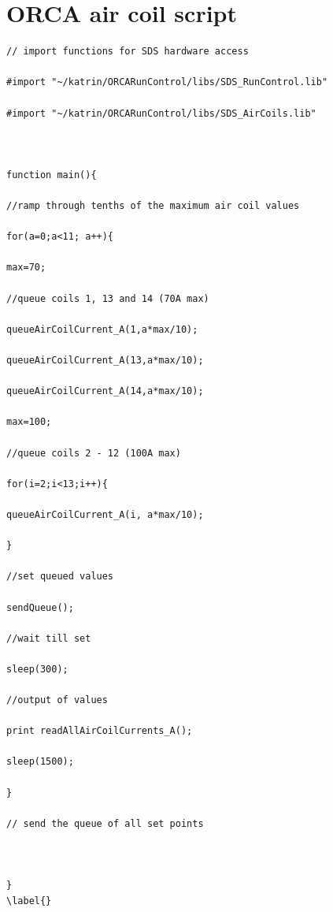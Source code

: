 

\appendix

{}	%
{}	%

\setcounter{figure}{0}


\section{ORCA air coil script}
\label{ch:appendix:sec:orcaScript}
\begin{verbatim}
// import functions for SDS hardware access

#import "~/katrin/ORCARunControl/libs/SDS_RunControl.lib"

#import "~/katrin/ORCARunControl/libs/SDS_AirCoils.lib"



function main(){

//ramp through tenths of the maximum air coil values

for(a=0;a<11; a++){

max=70;

//queue coils 1, 13 and 14 (70A max)

queueAirCoilCurrent_A(1,a*max/10);

queueAirCoilCurrent_A(13,a*max/10);

queueAirCoilCurrent_A(14,a*max/10);

max=100;

//queue coils 2 - 12 (100A max)

for(i=2;i<13;i++){

queueAirCoilCurrent_A(i, a*max/10);

}

//set queued values

sendQueue();

//wait till set

sleep(300);

//output of values

print readAllAirCoilCurrents_A();

sleep(1500);

}

// send the queue of all set points



}
\label{}
\end{verbatim}

